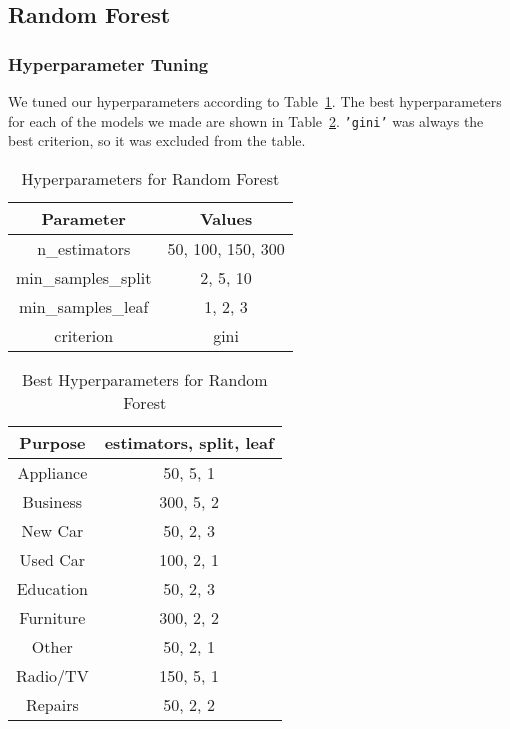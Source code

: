 \documentclass[12pt,twocolumn]{article}
\begin{document}
\subsection{Random Forest}
\subsubsection{Hyperparameter Tuning}
We tuned our hyperparameters according to Table~\ref{tab:random_forest_hyperparameters}. The best hyperparameters for each of the models we made are shown in Table~\ref{tab:random_forest_best_hyperparameters}. \texttt{'gini'} was always the best criterion, so it was excluded from the table.
\begin{table}
    \centering
    \begin{tabular}{|c|c|}
        \hline
        Parameter & Values \\
        \hline
        \hline
        n\_estimators & 50, 100, 150, 300 \\
        \hline
        min\_samples\_split & 2, 5, 10 \\
        \hline
        min\_samples\_leaf & 1, 2, 3 \\
        \hline
        criterion & gini \\
        \hline
    \end{tabular}
    \caption{Hyperparameters for Random Forest}\label{tab:random_forest_hyperparameters}
\end{table}

\begin{table}
    \centering
    \begin{tabular}{|c|c|}
        \hline
        Purpose & estimators, split, leaf \\
        \hline
        \hline
        Appliance & 50, 5, 1 \\
        \hline
        Business & 300, 5, 2 \\
        \hline
        New Car & 50, 2, 3 \\
        \hline
        Used Car & 100, 2, 1 \\
        \hline
        Education & 50, 2, 3 \\
        \hline
        Furniture & 300, 2, 2 \\
        \hline
        Other & 50, 2, 1 \\
        \hline
        Radio/TV & 150, 5, 1 \\
        \hline
        Repairs & 50, 2, 2 \\
        \hline
    \end{tabular}
    \caption{Best Hyperparameters for Random Forest}\label{tab:random_forest_best_hyperparameters}
\end{table}
\end{document}
